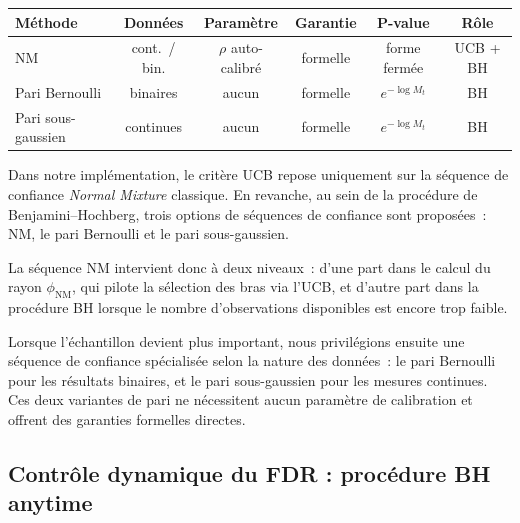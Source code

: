 \documentclass[10.5pt,a4paper]{article}
\newcommand{\phinm}{\phi_{\mathrm{NM}}}
\begin{document}
\begin{pratique}                                                      
  \renewcommand{\arraystretch}{1.35}                                
  \begin{tabular}{@{}lccccc@{}}                                     
  \toprule                                                          
  \textbf{M\'ethode} & \textbf{Donn\'ees} & \textbf{Param\`etre} &  
  \textbf{Garantie} & \textbf{P-value} & \textbf{R\^ole} \\         
  \midrule                                                          
  NM                 & cont.\ / bin.              & $\rho$
  auto-calibr\'e & formelle  & forme ferm\'ee  & UCB + BH \\
  Pari Bernoulli     & binaires                   & aucun
        & formelle  & $e^{-\log M_t}$ & BH       \\                 
  Pari sous-gaussien & continues                  & aucun
        & formelle  & $e^{-\log M_t}$ & BH       \\                 
  \bottomrule     
  \end{tabular}                                                     
  \end{pratique}  

  Dans notre impl\'ementation, le crit\`ere UCB repose uniquement sur
  la s\'equence de confiance \textit{Normal Mixture} classique.
  En revanche, au sein de la proc\'edure de Benjamini--Hochberg,
  trois options de s\'equences de confiance sont propos\'ees~:
  NM, le pari Bernoulli et le pari sous-gaussien.

  La s\'equence NM intervient donc \`a deux niveaux~: d'une part dans
  le calcul du rayon $\phinm$, qui pilote la s\'election des bras via
  l'UCB, et d'autre part dans la proc\'edure BH lorsque le nombre
  d'observations disponibles est encore trop faible.

  Lorsque l'\'echantillon devient plus important, nous privil\'egions
  ensuite une s\'equence de confiance sp\'ecialis\'ee selon la nature
  des donn\'ees~: le pari Bernoulli pour les r\'esultats binaires, et
  le pari sous-gaussien pour les mesures continues. Ces deux variantes
  de pari ne n\'ecessitent aucun param\`etre de calibration et offrent
  des garanties formelles directes.

\subsection{Contr\^ole dynamique du FDR : proc\'edure BH anytime}
\end{document}
